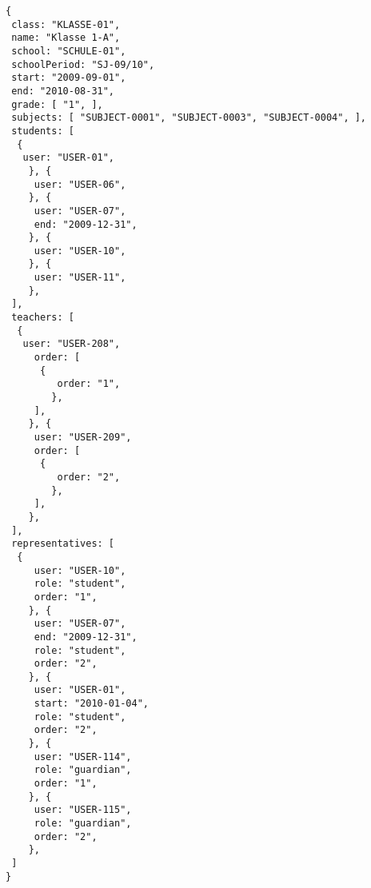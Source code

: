 
\begin{lstlisting}[caption={Klassen-Datenmodell
 Beispiel 2: Grundschulklasse},frame=tlrb]
{
 class: "KLASSE-01",
 name: "Klasse 1-A",
 school: "SCHULE-01",
 schoolPeriod: "SJ-09/10",
 start: "2009-09-01",
 end: "2010-08-31",
 grade: [ "1", ],
 subjects: [ "SUBJECT-0001", "SUBJECT-0003", "SUBJECT-0004", ],
 students: [
  { 
   user: "USER-01",
	}, { 
	 user: "USER-06",
	}, { 
	 user: "USER-07",
	 end: "2009-12-31",
	}, { 
	 user: "USER-10",
	}, { 
	 user: "USER-11",
	},
 ],
 teachers: [
  { 
   user: "USER-208",
	 order: [
	  {
		 order: "1",
		},
	 ],
	}, { 
	 user: "USER-209",
	 order: [
	  {
		 order: "2",
		},
	 ],
	},
 ],
 representatives: [
  {
	 user: "USER-10",
	 role: "student",
	 order: "1",	 
	}, {
	 user: "USER-07",
	 end: "2009-12-31",
	 role: "student",
	 order: "2",	 
	}, {
	 user: "USER-01",
	 start: "2010-01-04",
	 role: "student",
	 order: "2",	 
	}, {
	 user: "USER-114",
	 role: "guardian",
	 order: "1",	 
	}, {
	 user: "USER-115",
	 role: "guardian",
	 order: "2",	 
	},  
 ]
}
\end{lstlisting}

